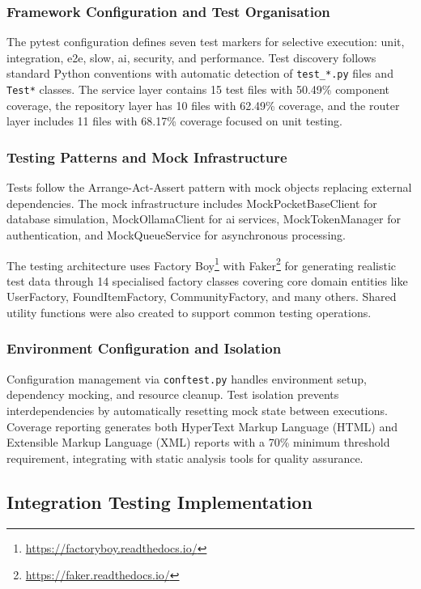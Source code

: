 \subsubsection{Framework Configuration and Test Organisation}

The pytest configuration defines seven test markers for selective execution: unit, integration, e2e, slow, ai, security, and performance. Test discovery follows standard Python conventions with automatic detection of \texttt{test\_*.py} files and \texttt{Test*} classes. The service layer contains 15 test files with 50.49\% component coverage, the repository layer has 10 files with 62.49\% coverage, and the router layer includes 11 files with 68.17\% coverage focused on unit testing.

\subsubsection{Testing Patterns and Mock Infrastructure}

Tests follow the Arrange-Act-Assert pattern \cite{Wake2001,Beck2002} with mock objects replacing external dependencies. The mock infrastructure includes MockPocketBaseClient for database simulation, MockOllamaClient for \ac{ai} services, MockTokenManager for authentication, and MockQueueService for asynchronous processing.

The testing architecture uses Factory Boy\footnote{\url{https://factoryboy.readthedocs.io/}} with Faker\footnote{\url{https://faker.readthedocs.io/}} for generating realistic test data through 14 specialised factory classes covering core domain entities like UserFactory, FoundItemFactory, CommunityFactory, and many others. Shared utility functions were also created to support common testing operations.

\subsubsection{Environment Configuration and Isolation}

Configuration management via \texttt{conftest.py} handles environment setup, dependency mocking, and resource cleanup. Test isolation prevents interdependencies by automatically resetting mock state between executions. Coverage reporting generates both HyperText Markup Language (HTML) and Extensible Markup Language (XML) reports with a 70\% minimum threshold requirement, integrating with static analysis tools for quality assurance.

\subsection{Integration Testing Implementation} \label{subsection:integration_testing_implementation}

